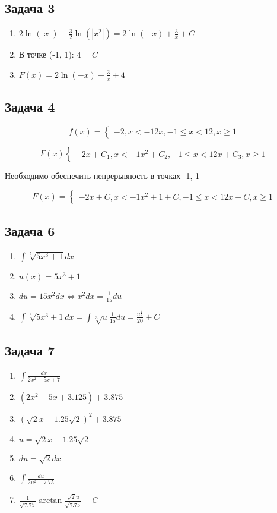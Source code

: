 \documentclass[a4paper,12pt]{article}
\begin{document}
\subsection{Задача 3}
\begin{enumerate}
    \item $2\ln(|x|)-\frac{3}{2}\ln(|x^2|)=2\ln(-x)+\frac{3}{x}+C$
    \item В точке (-1, 1): $4=C$
    \item $F(x) = 2\ln(-x)+\frac{3}{x}+4$
\end{enumerate}

\subsection{Задача 4}
\[f(x) = 
\begin{cases}
    -2, x < -1
    2x, -1 \le x < 1
    2, x\ge 1
\end{cases}
\]

\[F(x)
    \begin{cases}
        -2x+C_1, x < -1
        x^2+C_2, -1 \le x < 1
        2x+C_3, x\ge 1
    \end{cases}
\]

Необходимо обеспечить непрерывность в точках -1, 1

\[
F(x) = 
\begin{cases}
    -2x+C, x < -1
    x^2+1+C, -1 \le x < 1
    2x+C, x\ge 1
\end{cases}
\]

\subsection{Задача 6}
\begin{enumerate}
    \item $\int \sqrt[5]{5x^3+1}dx$
    \item $u(x) = 5x^3+1$
    \item $du = 15x^2dx \Leftrightarrow x^2dx = \frac{1}{15}du$
    \item $\int \sqrt[3]{5x^3+1}dx = \int \sqrt[3]{u}\frac{1}{15}du = \frac{u^{\frac{4}{3}}}{20} + C$
\end{enumerate}

\subsection{Задача 7}
\begin{enumerate}
    \item $\int \frac{dx}{2x^2-5x+7}$
    \item $(2x^2-5x+3.125)+3.875$
    \item $(\sqrt{2}x-1.25\sqrt{2})^2+3.875$
    \item $u = \sqrt{2}x-1.25\sqrt{2}$
    \item $du =\sqrt{2}dx$
    \item $\int \frac{du}{2u^2+7.75}$
    \item $\frac{1}{\sqrt{7.75}}\arctan \frac{\sqrt{2}u}{\sqrt{7.75}}+C$
\end{enumerate}
\end{document}
